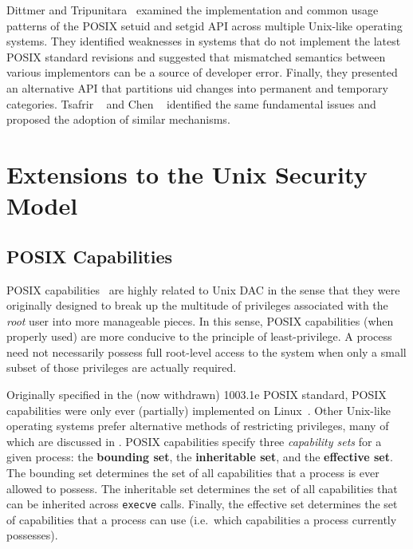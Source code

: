 Dittmer and Tripunitara~\cite{dittmer2014_setuid} examined the implementation and common
usage patterns of the POSIX setuid and setgid API across multiple Unix-like operating
systems. They identified weaknesses in systems that do not implement the latest POSIX
standard revisions and suggested that mismatched semantics between various implementors
can be a source of developer error. Finally, they presented an alternative API that
partitions \gls{uid} changes into permanent and temporary categories. Tsafrir
\etal~\cite{tsafrir2008_setuid} and Chen \etal~\cite{chen2002_setuid} identified the same
fundamental issues and proposed the adoption of similar mechanisms.


%



\section{Extensions to the Unix Security Model}%
\label{s:security-extensions}

\subsection{POSIX Capabilities}

POSIX capabilities~\cite{posix_capabilities, corbet2006_capabities_a,
corbet2006_capabities_b} are highly related to Unix DAC in the sense that they were
originally designed to break up the multitude of privileges associated with the
\textit{root} user into more manageable pieces. In this sense, POSIX capabilities (when
properly used) are more conducive to the principle of least-privilege. A process need not
necessarily possess full root-level access to the system when only a small subset of those
privileges are actually required.

Originally specified in the (now withdrawn) 1003.1e POSIX standard, POSIX capabilities
were only ever (partially) implemented on Linux~\cite{anderson2017_comparison}. Other
Unix-like operating systems prefer alternative methods of restricting privileges, many of
which are discussed in . POSIX capabilities specify three
\textit{capability sets} for a given process: the \textbf{bounding set}, the
\textbf{inheritable set}, and the \textbf{effective set}. The bounding set determines the
set of all capabilities that a process is ever allowed to possess. The inheritable set
determines the set of all capabilities that can be inherited across \texttt{execve} calls.
Finally, the effective set determines the set of capabilities that a process can use
(i.e.~which capabilities a process currently possesses).

